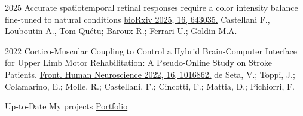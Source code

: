 \documentclass[9pt]{developercv} %
\begin{document}
\vspace{-15 pt}
\begin{entrylist}
	    \entry
	{2025}
	{Accurate spatiotemporal retinal responses require a color intensity balance fine-tuned to natural conditions}
	{\textcolor{blue}{\href{https://doi.org/10.1101/2025.03.13.643035}
			{bioRxiv 2025, 16, 643035.}}}
	{Castellani F., Louboutin A., Tom Quétu; Baroux R.; Ferrari U.;  Goldin M.A.}
	
	
    \entry
		{2022}
		{Cortico-Muscular Coupling to Control a Hybrid Brain-Computer Interface for Upper Limb Motor Rehabilitation: A Pseudo-Online Study on Stroke Patients.}
		{\textcolor{blue}{\href{https://doi.org/10.3389/fnhum.2022.1016862}
{Front. Human Neuroscience 2022, 16, 1016862.}}}
		{de Seta, V.; Toppi, J.; Colamarino, E.; Molle, R.; Castellani, F.; Cincotti, F.; Mattia, D.; Pichiorri, F.}
    
\end{entrylist}


\vspace{-15 pt}
\begin{entrylist}
    \entry
		{Up-to-Date}
		{My projects}
		{\textcolor{blue}{\href{https://filippocastellani.github.io/Portfolio/}{Portfolio}}}
		{  }
\end{entrylist}
\end{document}
